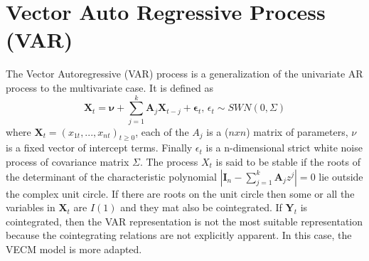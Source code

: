 \documentclass[11pt,a4,twosided,singlespacing,titlepagenumber=on]{scrreprt}
\numberwithin{equation}{chapter} %
\theoremstyle{remark}
\newcommand{\matr}[1]{\mathbf{#1}}
\begin{document}
\section{Vector Auto Regressive Process (VAR)}
The Vector Autoregressive (VAR) process is a generalization of the univariate AR process to the multivariate case. It is defined as
\begin{equation}
\matr{X}_t = \matr{\nu} + \sum_{j=1}^k \matr{A}_j \matr{X}_{t-j} + \matr{\epsilon}_t \text{, } \epsilon_t \sim SWN(0, \Sigma)
\end{equation}
where $\matr{X}_t = (x_{1t},...,x_{nt})_{t \geq 0}$, each of the $A_j$ is a ($nxn$) matrix of parameters, $\nu$ is a fixed vector of intercept terms. Finally $\epsilon_t$ is a n-dimensional strict white noise process of covariance matrix $\Sigma$. The process $X_t$ is said to be stable if the roots of the determinant of the characteristic polynomial $|\matr{I}_n - \sum_{j=1}^k \matr{A}_j z^j| = 0$ lie outside the complex unit circle. If there are roots on the unit circle then some or all the variables in $\matr{X}_t$ are $I(1)$ and they mat also be cointegrated. If $\matr{Y}_t$ is cointegrated, then the VAR representation is not the most suitable representation because the cointegrating relations are not explicitly apparent. In this case, the VECM model is more adapted.
\end{document}
